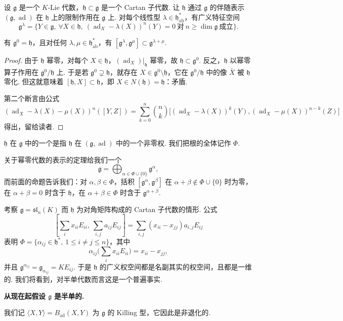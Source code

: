 \begin{numpara}\label{np:ssl-3-1-1}
设 $\mathfrak g$ 是一个 $K$-Lie 代数，$\mathfrak h\subset\mathfrak g$ 是一个 Cartan 子代数. 让 $\mathfrak h$ 通过 $\mathfrak g$ 的伴随表示 $(\mathfrak g,\operatorname{ad})$ 在 $\mathfrak h$ 上的限制作用在 $\mathfrak g$ 上. 对每个线性型 $\lambda\in\mathfrak h^{*}_{\mathrm{ab}}$，有广义特征空间
\[\mathfrak g^\lambda=\{Y\in\mathfrak g,\ \forall X\in\mathfrak h,\ (\operatorname{ad}_X-\lambda(X))^n(Y)=0\ \text{对}\ n\geqslant\dim\mathfrak g\ \text{成立}\}.\]
\begin{lemma*}
有 $\mathfrak g^0=\mathfrak h$，且对任何 $\lambda,\mu\in\mathfrak h^{*}_{\mathrm{ab}}$，有 $[\mathfrak g^\lambda,\mathfrak g^\mu]\subset\mathfrak g^{\lambda+\mu}$.
\end{lemma*}
\begin{proof}
由于 $\mathfrak h$ 幂零，对每个 $X\in\mathfrak h$，$(\operatorname{ad}_X)|_{\mathfrak h}$ 幂零，故 $\mathfrak h\subset\mathfrak g^0$. 反之，$\mathfrak h$ 以幂零算子作用在 $\mathfrak g^0/\mathfrak h$ 上. 于是若 $\mathfrak g^0\supsetneq\mathfrak h$，就存在 $X\in\mathfrak g^0\setminus\mathfrak h$，它在 $\mathfrak g^0/\mathfrak h$ 中的像 $\bar X$ 被 $\mathfrak h$ 零化. 但这就意味着 $[\mathfrak h,X]\subset\mathfrak h$，即 $X\in N(\mathfrak h)=\mathfrak h$：矛盾.

第二个断言由公式
\[(\operatorname{ad}_X-\lambda(X)-\mu(X))^n([Y,Z])=\sum_{k=0}^n\binom{n}{k}\big[(\operatorname{ad}_X-\lambda(X))^k(Y),(\operatorname{ad}_X-\mu(X))^{n-k}(Z)\big]\]
得出，留给读者.
\end{proof}
\begin{definition*}
$\mathfrak h$ 在 $\mathfrak g$ 中的一个是指 $\mathfrak h$ 在 $(\mathfrak g,\operatorname{ad})$ 中的一个非零权. 我们把根的全体记作 $\Phi$.
\end{definition*}
关于幂零代数的表示的定理给我们一个
\[\mathfrak g=\bigoplus_{\alpha\in\Phi\cup\{0\}}\mathfrak g^\alpha,\]
而前面的命题告诉我们：对 $\alpha,\beta\in\Phi$，括积 $[\mathfrak g^\alpha,\mathfrak g^\beta]$ 在 $\alpha+\beta\notin\Phi\cup\{0\}$ 时为零，在 $\alpha+\beta=0$ 时含于 $\mathfrak h$，在 $\alpha+\beta\in\Phi$ 时含于 $\mathfrak g^{\alpha+\beta}$.
\begin{example*}
考察 $\mathfrak g=\mathfrak{sl}_n(K)$ 而 $\mathfrak h$ 为对角矩阵构成的 Cartan 子代数的情形. 公式
\[[\sum_i x_{ii}E_{ii},\ \sum_{i,j}a_{ij}E_{ij}]=\sum_{i,j}(x_{ii}-x_{jj})a_{i,j}E_{ij}\]
表明 $\Phi=\{\alpha_{ij}\in\mathfrak h^*,\ 1\leqslant i\neq j\leqslant n\}$，其中
\[\alpha_{ij}\Big(\sum_i x_{ii}E_{ii}\Big)=x_{ii}-x_{jj},\]
并且 $\mathfrak g^{\alpha_{ij}}=\mathfrak g_{\alpha_{ij}}=KE_{ij}$. 于是 $\mathfrak h$ 的广义权空间都是名副其实的权空间，且都是一维的. 我们将看到，对半单代数而言这是一个普遍事实.
\end{example*}

\textbf{从现在起假设 $\mathfrak g$ 是半单的.}

我们记 $\langle X,Y\rangle=B_{\operatorname{ad}}(X,Y)$ 为 $\mathfrak g$ 的 Killing 型，它因此是非退化的.
\end{numpara}
